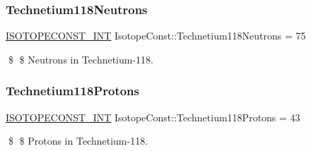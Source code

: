 \subsubsection{\texorpdfstring{Technetium118\+Neutrons}{Technetium118Neutrons}}
{\footnotesize\ttfamily \mbox{\hyperlink{group___isotope_const-_macros_ga5f18360b3e99483a35c32d789e62621c}{I\+S\+O\+T\+O\+P\+E\+C\+O\+N\+S\+T\+\_\+\+I\+NT}} Isotope\+Const\+::\+Technetium118\+Neutrons = 75}

\$ \$ Neutrons in Technetium-\/118. \mbox{\label{group___isotope_const-_technetium-_tc118_gaef1c89cb1ef152617ec388a5aa3f85f1}} 
\subsubsection{\texorpdfstring{Technetium118\+Protons}{Technetium118Protons}}
{\footnotesize\ttfamily \mbox{\hyperlink{group___isotope_const-_macros_ga5f18360b3e99483a35c32d789e62621c}{I\+S\+O\+T\+O\+P\+E\+C\+O\+N\+S\+T\+\_\+\+I\+NT}} Isotope\+Const\+::\+Technetium118\+Protons = 43}

\$ \$ Protons in Technetium-\/118. 